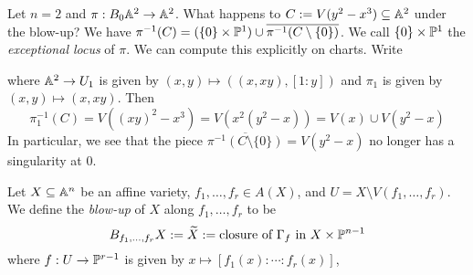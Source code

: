 \begin{example}
  Let $n = 2$ and $\pi : B_0 \mathbb{A}^2 \to \mathbb{A}^2$.
  What happens to
  $C := V(y^2 - x^3) \subseteq \mathbb{A}^2$
  under the blow-up?
  We have $\pi^{-1}(C) = (\{0\} \times \mathbb{P}^1) \cup \overline{\pi^{-1}(C \setminus \{0\})}$.
  We call $\{0\} \times \mathbb{P}^1$
  the \emph{exceptional locus} of $\pi$.
  We can compute this explicitly
  on charts. Write
  \begin{center}
  \end{center}
  where $\mathbb{A}^2 \to U_1$ is given by
  $(x, y) \mapsto ((x, x y), [1 : y])$
  and $\pi_1$ is given by
  $(x, y) \mapsto (x, x y)$. Then
  \[
    \pi_1^{-1}(C)
    = V((x y)^2 - x^3)
    = V(x^2 (y^2 - x))
    = V(x) \cup V(y^2 - x)
  \]
  In particular, we see that the
  piece $\overline{\pi^{-1}(C \setminus \{0\})} = V(y^2 - x)$
  no longer has a singularity at $0$.
\end{example}

\begin{definition}
  Let $X \subseteq \mathbb{A}^n$ be an
  affine variety, $f_1, \dots, f_r \in A(X)$,
  and $U = X \setminus V(f_1, \dots, f_r)$.
  We define the \emph{blow-up} of $X$ along
  $f_1, \dots, f_r$ to be
  \[
    B_{f_1, \dots, f_r} X
    := \widetilde{X}
    := \text{closure of } \Gamma_f \text{ in } X \times \mathbb{P}^{n - 1}
  \]
  where $f : U \to \mathbb{P}^{r - 1}$
  is given by $x \mapsto [f_1(x) : \cdots : f_r(x)]$,
\end{definition}

